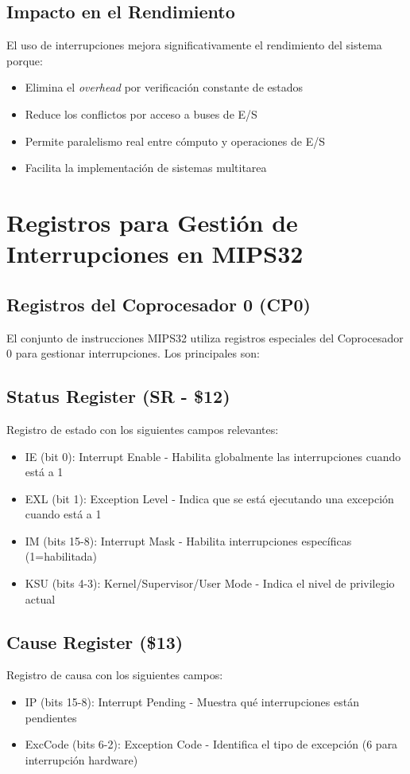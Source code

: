 \documentclass{article}
\begin{document}
\subsection{Impacto en el Rendimiento}

El uso de interrupciones mejora significativamente el rendimiento del sistema porque:

\begin{itemize}[leftmargin=*]
    \item Elimina el \textit{overhead} por verificación constante de estados
    \item Reduce los conflictos por acceso a buses de E/S
    \item Permite paralelismo real entre cómputo y operaciones de E/S
    \item Facilita la implementación de sistemas multitarea
\end{itemize}
\section{Registros para Gestión de Interrupciones en MIPS32}
\subsection{Registros del Coprocesador 0 (CP0)}

El conjunto de instrucciones MIPS32 utiliza registros especiales del Coprocesador 0 para gestionar interrupciones. Los principales son:

\subsection{Status Register (SR - \$12)}
Registro de estado con los siguientes campos relevantes:
\begin{itemize}
\item IE (bit 0): Interrupt Enable - Habilita globalmente las interrupciones cuando está a 1
\item EXL (bit 1): Exception Level - Indica que se está ejecutando una excepción cuando está a 1
\item IM (bits 15-8): Interrupt Mask - Habilita interrupciones específicas (1=habilitada)
\item KSU (bits 4-3): Kernel/Supervisor/User Mode - Indica el nivel de privilegio actual
\end{itemize}

\subsection{Cause Register (\$13)}
Registro de causa con los siguientes campos:
\begin{itemize}
\item IP (bits 15-8): Interrupt Pending - Muestra qué interrupciones están pendientes
\item ExcCode (bits 6-2): Exception Code - Identifica el tipo de excepción (6 para interrupción hardware)
\end{itemize}
\end{document}
